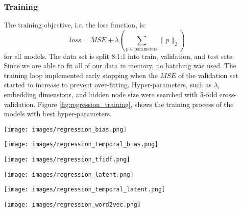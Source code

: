 \documentclass[final]{cvpr}
\begin{document}
\subsubsection{Training}
The training objective, i.e. the loss function, is:
$$loss = MSE + \lambda (\sum\limits_{p \in \text{parameters}} \|p\|_2)$$
for all models.
The data set is split 8:1:1 into train, validation, and test sets. 
Since we are able to fit all of our data in memory, no batching was used.
The training loop implemented early stopping when the $MSE$ of the validation set started to increase to prevent over-fitting.
Hyper-parameters, such as $\lambda$, embedding dimensions, and hidden node size were searched with 5-fold cross-validation. Figure \ref{fig:regression_training}, shows the training process of the models with best hyper-parameters.

\begin{figure*}[ht]
    \centering
    \begin{minipage}{0.3\textwidth}
        \texttt{[image: images/regression\_bias.png]}
        \caption*{Bias}
    \end{minipage}
    \hfill
    \begin{minipage}{0.3\textwidth}
        \texttt{[image: images/regression\_temporal\_bias.png]}
        \caption*{Temporal Bias}
    \end{minipage}
    \hfill
    \begin{minipage}{0.3\textwidth}
        \texttt{[image: images/regression\_tfidf.png]}
        \caption*{tfidf MLP}
    \end{minipage}
    
    \begin{minipage}{0.3\textwidth}
        \texttt{[image: images/regression\_latent.png]}
        \caption*{Latent Factor}
    \end{minipage}
    \hfill
    \begin{minipage}{0.3\textwidth}
        \texttt{[image: images/regression\_temporal\_latent.png]}
        \caption*{Temporal Latent Factor}
    \end{minipage}
    \hfill
    \begin{minipage}{0.3\textwidth}
        \texttt{[image: images/regression\_word2vec.png]}
        \caption*{Word2Vec MLP}
    \end{minipage}
    \caption{Training Process}
    \label{fig:regression_training}
\end{figure*}
\end{document}

